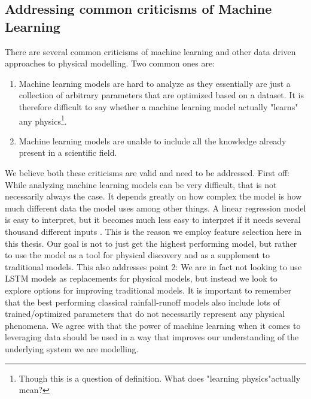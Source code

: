 \subsection{Addressing common criticisms of Machine Learning}
There are several common criticisms of machine learning and other data driven 
approaches to physical modelling. Two common ones are:
\begin{enumerate}
    \item Machine learning models are hard to analyze as they essentially are just a collection of arbitrary parameters that are optimized based on a dataset. It is therefore difficult to say whether a machine learning model actually "learns" any physics\footnote{Though this is a question of definition. What does "learning physics"actually mean?}.
    \item Machine learning models are unable to include all the knowledge already present in a scientific field.
\end{enumerate}
We believe both these criticisms are valid and need to be addressed. First off: 
While analyzing machine learning models can be very difficult, that is not necessarily 
always the case. It depends greatly on how complex the model is how much different 
data the model uses among other things. A linear regression model is easy to interpret, 
but it becomes much less easy to interpret if it needs several thousand different 
inputs \citep{elemstatlearn}. This is the reason we employ feature selection here 
in this thesis. Our goal is not to just get the highest performing model, but rather 
to use the model as a tool for physical discovery and as a supplement to traditional models. This also addresses point 2: 
We  are in fact not looking to use LSTM models as replacements for physical models, 
but instead we look to explore options for improving traditional models.
It is important to remember that the best performing 
classical rainfall-runoff models also include lots of trained/optimized parameters 
that do not necessarily represent any physical phenomena. We agree with \citet{hybrid_paper} 
that the power of machine learning when it comes to leveraging data should be 
used in a way that improves our understanding of the underlying system we are modelling. 
